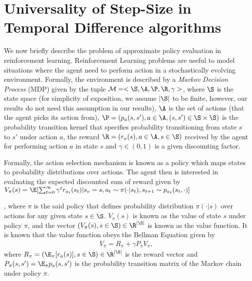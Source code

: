 \section{Universality of Step-Size in Temporal Difference algorithms}
We now briefly describe the problem of approximate policy evaluation in reinforcement learning. 
Reinforcement Learning problems are useful to model situations where the agent need to perform action in a stochastically evolving environment. Formally, the environment is described by a \emph{Markov Decision Process} (MDP) given by the tuple $\mathcal{M}=<\S,\A,\P,\R,\gamma>$, where $\S$ is the state space (for simplicity of exposition, we assume $|\S|$ to be finite, however, our results do not need this assumption in our results), $\A$ is the set of actions (that the agent picks its action from), $\P=(p_a(s,s'),a\in \A, (s,s') \in \S\times \S)$ is the probability transition kernel that specifies probability transitioning from state $s$ to $s'$ under action $a$, the reward $\R=(r_a(s),a\in \A, s\in\S)$ received by the agent for performing action $a$ in state $s$ and $\gamma\in (0,1)$ is a given discounting factor.

Formally, the action selection mechanism is known as a policy which maps states to probability distributions over actions. The agent then is interested in evaluating the expected  discounted sum of reward given by $V_\pi(s)=\E[\sum_{t=0}^\infty\gamma^t r_{a_t}(s_t)| s_o=s, a_t\sim\pi(\cdot|s_t), s_{t+1}\sim p_{a_t}(s_t,\cdot)]$
\begin{comment}
\begin{align}\label{eq:valfuncs}
V_\pi(s)=\E[\sum_{t=0}^\infty\gamma^t r_{a_t}(s_t)| s_o=s, a_t\sim\pi(\cdot|s_t), s_{t+1}\sim p_{a_t}(s_t,\cdot)]\end{align}
\end{comment}
, where $\pi$ is the said policy that defines probability distribution $\pi(\cdot | s)$ over actions for any given state $s\in \S$. $V_\pi(s)$ is known as the value of state $s$ under policy $\pi$, and the vector $(V_\pi(s),s\in\S)\in\R^{|\S|}$ is known as the value function. It is known that the value function obeys the Bellman Equation given by
\begin{align}\label{eq:bell}
V_\pi=R_\pi+\gamma P_\pi V_\pi,
\end{align}
where $R_\pi=(\E_\pi[r_a(s)],s\in\S)\in \R^{|\S|}$ is the reward vector and $P_\pi(s,s')=\E_\pi p_a(s,s')$ is the probability transition matrix of the Markov chain under policy $\pi$.

